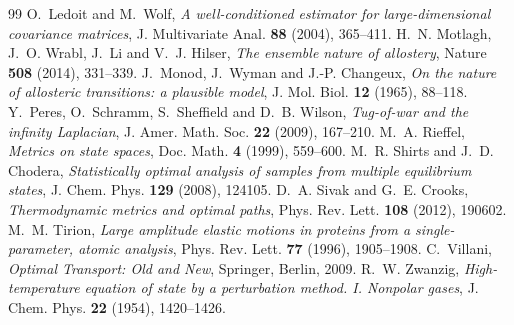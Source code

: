 \documentclass[11pt,reqno]{amsart}
\theoremstyle{plain}
\theoremstyle{definition}
\theoremstyle{remark}
\numberwithin{equation}{section}
\begin{document}
\begin{thebibliography}{99}
 O.~Ledoit and M.~Wolf, \emph{A well-conditioned estimator for large-dimensional covariance matrices}, J. Multivariate Anal. \textbf{88} (2004), 365--411.
 H.~N. Motlagh, J.~O. Wrabl, J.~Li and V.~J. Hilser, \emph{The ensemble nature of allostery}, Nature \textbf{508} (2014), 331--339.
 J.~Monod, J.~Wyman and J.-P. Changeux, \emph{On the nature of allosteric transitions: a plausible model}, J. Mol. Biol. \textbf{12} (1965), 88--118.
 Y.~Peres, O.~Schramm, S.~Sheffield and D.~B. Wilson, \emph{Tug-of-war and the infinity Laplacian}, J. Amer. Math. Soc. \textbf{22} (2009), 167--210.
 M.~A. Rieffel, \emph{Metrics on state spaces}, Doc. Math. \textbf{4} (1999), 559--600.
 M.~R. Shirts and J.~D. Chodera, \emph{Statistically optimal analysis of samples from multiple equilibrium states}, J. Chem. Phys. \textbf{129} (2008), 124105.
 D.~A. Sivak and G.~E. Crooks, \emph{Thermodynamic metrics and optimal paths}, Phys. Rev. Lett. \textbf{108} (2012), 190602.
 M.~M. Tirion, \emph{Large amplitude elastic motions in proteins from a single-parameter, atomic analysis}, Phys. Rev. Lett. \textbf{77} (1996), 1905--1908.
 C.~Villani, \emph{Optimal Transport: Old and New}, Springer, Berlin, 2009.
 R.~W. Zwanzig, \emph{High-temperature equation of state by a perturbation method. I. Nonpolar gases}, J. Chem. Phys. \textbf{22} (1954), 1420--1426.
\end{thebibliography}
\end{document}
